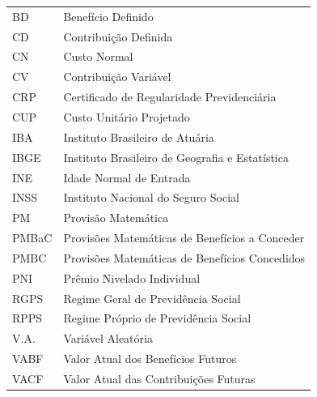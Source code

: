 \documentclass[12pt,a4paper,oneside]{report}
\renewcommand{\headrulewidth}{0pt}
\newcommand{\textual}{
    \newpage
    \pagenumbering{arabic}
    \setcounter{page}{11}
    \setlength{\parindent}{1.25cm}
    \pagestyle{fancy}
    \fancyhf{}
    \fancyhead[R]{\thepage}
    \renewcommand{\headrulewidth}{0pt}
}
\renewcommand{\headrulewidth}{0pt}
\begin{document}
\fontsize{12}{14}\selectfont
\begin{tabular}{ll}
BD    & Benefício Definido \\
CD    & Contribuição Definida \\
CN    & Custo Normal \\
CV    & Contribuição Variável \\
CRP   & Certificado de Regularidade Previdenciária \\
CUP   & Custo Unitário Projetado \\
IBA   & Instituto Brasileiro de Atuária \\
IBGE  & Instituto Brasileiro de Geografia e Estatística \\
INE   & Idade Normal de Entrada \\
INSS  & Instituto Nacional do Seguro Social \\
PM    & Provisão Matemática \\
PMBaC & Provisões Matemáticas de Benefícios a Conceder \\
PMBC  & Provisões Matemáticas de Benefícios Concedidos \\
PNI   & Prêmio Nivelado Individual \\
RGPS  & Regime Geral de Previdência Social \\
RPPS  & Regime Próprio de Previdência Social \\
V.A.  & Variável Aleatória \\
VABF  & Valor Atual dos Benefícios Futuros \\
VACF  & Valor Atual das Contribuições Futuras \\
\end{tabular}

\newpage
\tableofcontents

\textual












\newpage
\renewcommand{\bibname}{REFERÊNCIAS}

 








\end{document}
